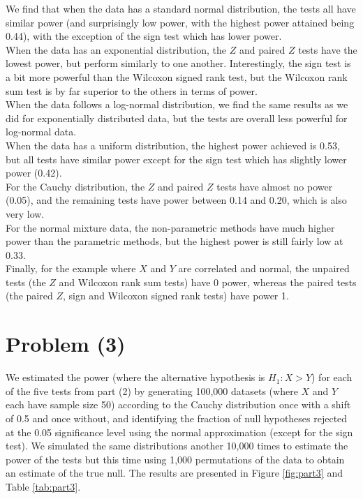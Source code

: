 \documentclass[11pt]{article}
\begin{document}
\noindent We find that when the data has a standard normal distribution, the tests all have similar power (and surprisingly low power, with the highest power attained being 0.44), with the exception of the sign test which has lower power.\\
 When the data has an exponential distribution, the $Z$ and paired $Z$ tests have the lowest power, but perform similarly to one another. Interestingly, the sign test is a bit more powerful than the Wilcoxon signed rank test, but the Wilcoxon rank sum test is by far superior to the others in terms of power. \\
 When the data follows a log-normal distribution, we find the same results as we did for exponentially distributed data, but the tests are overall less powerful for log-normal data.\\
  When the data has a uniform distribution, the highest power achieved is 0.53, but all tests have similar power except for the sign test which has slightly lower power (0.42).\\ 
  For the Cauchy distribution, the $Z$ and paired $Z$ tests have almost no power (0.05), and the remaining tests have power between 0.14 and 0.20, which is also very low. \\
  For the normal mixture data, the non-parametric methods have much higher power than the parametric methods, but the highest power is still fairly low at 0.33.\\
  Finally, for the example where $X$ and $Y$ are correlated and normal, the unpaired tests (the $Z$ and Wilcoxon rank sum tests) have 0 power, whereas the paired tests (the paired $Z$, sign and Wilcoxon signed rank tests) have power 1.

\section*{Problem (3)}
We estimated the power (where the alternative hypothesis is $H_1: X > Y$) for each of the five tests from part (2) by generating 100,000 datasets (where $X$ and $Y$ each have sample size 50) according to the Cauchy distribution once with a shift of 0.5 and once without, and identifying the fraction of null hypotheses rejected at the 0.05 significance level using the normal approximation (except for the sign test). We simulated the same distributions another 10,000 times to estimate the power of the tests but this time using 1,000 permutations of the data to obtain an estimate of the true null.  The results are presented in Figure \ref{fig:part3} and Table \ref{tab:part3}.
\end{document}
